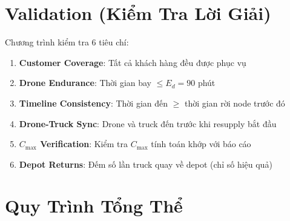 \documentclass[12pt,a4paper]{article}
\begin{document}
\section{Validation (Kiểm Tra Lời Giải)}

Chương trình kiểm tra 6 tiêu chí:
\begin{enumerate}[nosep]
    \item \textbf{Customer Coverage}: Tất cả khách hàng đều được phục vụ
    \item \textbf{Drone Endurance}: Thời gian bay $\leq E_d = 90$ phút
    \item \textbf{Timeline Consistency}: Thời gian đến $\geq$ thời gian rời node trước đó
    \item \textbf{Drone-Truck Sync}: Drone và truck đến trước khi resupply bắt đầu
    \item \textbf{$C_{\max}$ Verification}: Kiểm tra $C_{\max}$ tính toán khớp với báo cáo
    \item \textbf{Depot Returns}: Đếm số lần truck quay về depot (chỉ số hiệu quả)
\end{enumerate}

\section{Quy Trình Tổng Thể}
\end{document}
